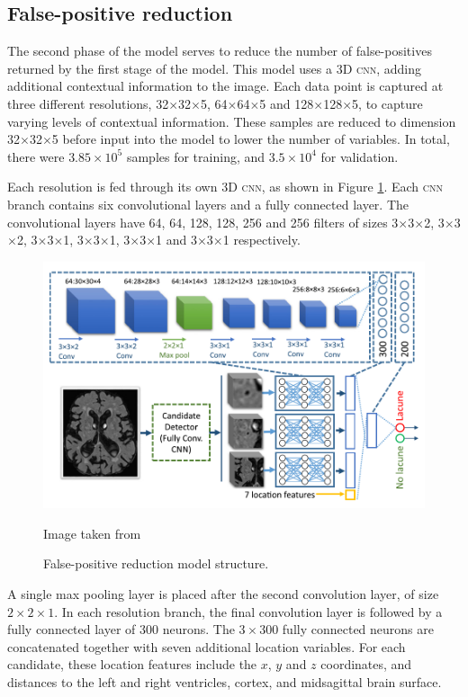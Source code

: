 \subsection*{False-positive reduction}

The second phase of the model serves to reduce the number of false-positives returned by the first stage of the model. This model uses a 3D \textsc{cnn}, adding additional contextual information to the image. Each data point is captured at three different resolutions, 32$\times$32$\times$5, 64$\times$64$\times$5 and 128$\times$128$\times$5, to capture varying levels of contextual information. These samples are reduced to dimension 32$\times$32$\times$5 before input into the model to lower the number of variables. In total, there were $3.85\times10^5$ samples for training, and $3.5\times10^4$ for validation. 

Each resolution is fed through its own 3D \textsc{cnn}, as shown in Figure \ref{litrev-ghafoorian_model2fig}. Each \textsc{cnn} branch contains six convolutional layers and a fully connected layer. The convolutional layers have 64, 64, 128, 128, 256 and 256 filters of sizes 3$\times$3$\times$2, 3$\times$3$\times$2, 3$\times$3$\times$1, 3$\times$3$\times$1, 3$\times$3$\times$1 and 3$\times$3$\times$1 respectively.

\begin{figure}[ht]
	\centering
	\includegraphics[width=\textwidth]{Images/5_ghafoorian_model2.png}
	\caption{False-positive reduction model structure.}
	\small Image taken from \cite{GhafoorianM.2017Dml3}
	\label{litrev-ghafoorian_model2fig}
\end{figure}

A single max pooling layer is placed after the second convolution layer, of size $2\times2\times1$. In each resolution branch, the final convolution layer is followed by a fully connected layer of 300 neurons. The $3\times300$ fully connected neurons are concatenated together with seven additional location variables. For each candidate, these location features include the $x$, $y$ and $z$ coordinates, and distances to the left and right ventricles, cortex, and midsagittal brain surface.

